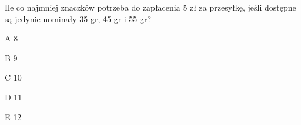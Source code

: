 \begin{tresc}
Ile co najmniej znaczków potrzeba do zapłacenia 5 zł za przesyłkę, jeśli dostępne są jedynie nominały 35 gr, 45 gr i 55 gr?
\end{tresc}
\begin{wariant}{A} 8 \end{wariant}
\begin{wariant}{B} 9 \end{wariant}
\begin{wariant}{C} 10 \end{wariant}
\begin{wariant}{D} 11 \end{wariant}
\begin{wariant}{E} 12 \end{wariant}
